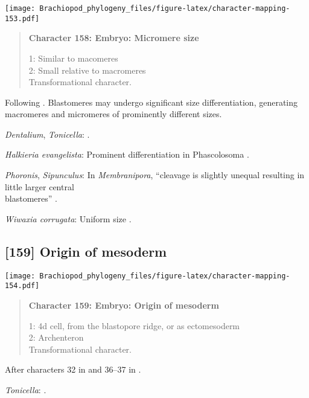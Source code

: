 \documentclass[openany]{book}
\theoremstyle{definition}
\theoremstyle{definition}
\theoremstyle{definition}
\theoremstyle{remark}
\begin{document}
\texttt{[image: Brachiopod\_phylogeny\_files/figure-latex/character-mapping-153.pdf]}

\begin{quote}
\textbf{Character 158: Embryo: Micromere size}

1: Similar to macomeres\\
2: Small relative to macromeres\\
Transformational character.
\end{quote}

Following \citet{Hejnol2010}. Blastomeres may undergo significant size
differentiation, generating macromeres and micromeres of prominently
different sizes.

\hypertarget{Dentalium-coding-158}{}
\emph{Dentalium}, \emph{Tonicella}: \citet{Williams1997Introduction}.

\hypertarget{Halkieria_evangelista-coding-158}{}
\emph{Halkieria evangelista}: Prominent differentiation in Phascolosoma
\citep{Adrianov2011}.

\hypertarget{Phoronis-coding-158}{}
\emph{Phoronis}, \emph{Sipunculus}: In \emph{Membranipora}, ``cleavage
is slightly unequal resulting in little larger central\\
blastomeres'' \citep{Gruhl2010M}.

\hypertarget{Wiwaxia_corrugata-coding-158}{}
\emph{Wiwaxia corrugata}: Uniform size \citep{Pennerstorfer2012}.

\subsection*{{[}159{]} Origin of mesoderm}\label{origin-of-mesoderm}

\texttt{[image: Brachiopod\_phylogeny\_files/figure-latex/character-mapping-154.pdf]}

\begin{quote}
\textbf{Character 159: Embryo: Origin of mesoderm}

1: 4d cell, from the blastopore ridge, or as ectomesoderm\\
2: Archenteron\\
Transformational character.
\end{quote}

After characters 32 in \citet{Grobe2007} and 36--37 in
\citet{Glenner2004}.

\hypertarget{Tonicella-coding-159}{}
\emph{Tonicella}: \citet{Williams1997Introduction}.
\end{document}
